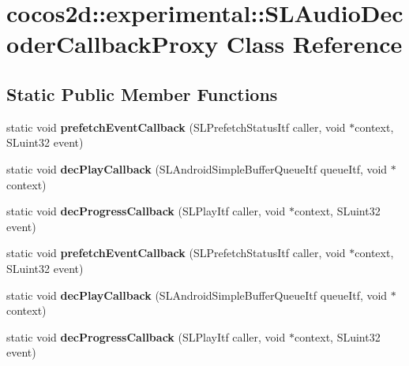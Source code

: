 \hypertarget{classcocos2d_1_1experimental_1_1SLAudioDecoderCallbackProxy}{}\section{cocos2d\+:\+:experimental\+:\+:S\+L\+Audio\+Decoder\+Callback\+Proxy Class Reference}
\label{classcocos2d_1_1experimental_1_1SLAudioDecoderCallbackProxy}
\subsection*{Static Public Member Functions}
\begin{DoxyCompactItemize}
\item 
\mbox{\label{classcocos2d_1_1experimental_1_1SLAudioDecoderCallbackProxy_af38cd00d9457b445c69258acfc8865aa}} 
static void {\bfseries prefetch\+Event\+Callback} (S\+L\+Prefetch\+Status\+Itf caller, void $\ast$context, S\+Luint32 event)
\item 
\mbox{\label{classcocos2d_1_1experimental_1_1SLAudioDecoderCallbackProxy_a4c3882bdcc00f3b106103a96a9343ac5}} 
static void {\bfseries dec\+Play\+Callback} (S\+L\+Android\+Simple\+Buffer\+Queue\+Itf queue\+Itf, void $\ast$context)
\item 
\mbox{\label{classcocos2d_1_1experimental_1_1SLAudioDecoderCallbackProxy_aaf362b8f5c3b1a41ef68189a2072b8c0}} 
static void {\bfseries dec\+Progress\+Callback} (S\+L\+Play\+Itf caller, void $\ast$context, S\+Luint32 event)
\item 
\mbox{\label{classcocos2d_1_1experimental_1_1SLAudioDecoderCallbackProxy_af38cd00d9457b445c69258acfc8865aa}} 
static void {\bfseries prefetch\+Event\+Callback} (S\+L\+Prefetch\+Status\+Itf caller, void $\ast$context, S\+Luint32 event)
\item 
\mbox{\label{classcocos2d_1_1experimental_1_1SLAudioDecoderCallbackProxy_a4c3882bdcc00f3b106103a96a9343ac5}} 
static void {\bfseries dec\+Play\+Callback} (S\+L\+Android\+Simple\+Buffer\+Queue\+Itf queue\+Itf, void $\ast$context)
\item 
\mbox{\label{classcocos2d_1_1experimental_1_1SLAudioDecoderCallbackProxy_aaf362b8f5c3b1a41ef68189a2072b8c0}} 
static void {\bfseries dec\+Progress\+Callback} (S\+L\+Play\+Itf caller, void $\ast$context, S\+Luint32 event)
\end{DoxyCompactItemize}


